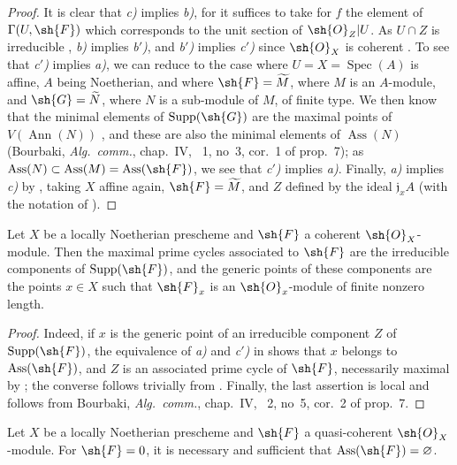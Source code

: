 \begin{proof}
It is clear that \emph{c)} implies \emph{b)}, for it suffices to take for $f$ the element of $\Gamma(U,\sh{F})$ which corresponds to the unit section of $\sh{O}_Z|U$.
As $U\cap Z$ is irreducible , \emph{b)} implies \emph{b$'$)}, and \emph{b$'$)} implies \emph{c$'$)} since $\sh{O}_X$ is coherent .
To see that \emph{c$'$)} implies \emph{a)}, we can reduce to the case where $U=X=\operatorname{Spec}(A)$ is affine, $A$ being Noetherian, and where $\sh{F}=\widetilde{M}$, where $M$ is an $A$-module, and $\sh{G}=\widetilde{N}$, where $N$ is a sub-module of $M$, of finite type.
We then know that the minimal elements of $\operatorname{Supp}(\sh{G})$ are the maximal points of $V(\operatorname{Ann}(N))$ , and these are also the minimal elements of $\operatorname{Ass}(N)$ (Bourbaki, \emph{Alg.\ comm.}, chap.~IV, \textsection~1, no~3, cor.~1 of prop.~7);
as $\operatorname{Ass}(N)\subset\operatorname{Ass}(M)=\operatorname{Ass}(\sh{F})$, we see that \emph{c$'$)} implies \emph{a)}.
Finally, \emph{a)} implies \emph{c)} by , taking $X$ affine again, $\sh{F}=\widetilde{M}$, and $Z$ defined by the ideal $\mathfrak{j}_xA$ (with the notation of ).
\end{proof}

\begin{corollary}[3.1.4]
\label{IV.3.1.4}
Let $X$ be a locally Noetherian prescheme and $\sh{F}$ a coherent $\sh{O}_X$-module.
Then the maximal prime cycles associated to $\sh{F}$ are the irreducible components of $\operatorname{Supp}(\sh{F})$, and the generic points of these components are the points $x\in X$ such that $\sh{F}_x$ is an $\sh{O}_x$-module of finite nonzero length.
\end{corollary}

\begin{proof}
Indeed, if $x$ is the generic point of an irreducible component $Z$ of $\operatorname{Supp}(\sh{F})$, the equivalence of \emph{a)} and \emph{c$'$)} in  shows that $x$ belongs to $\operatorname{Ass}(\sh{F})$, and $Z$ is an associated prime cycle of $\sh{F}$, necessarily maximal by ; the converse follows trivially from . Finally, the last assertion is local and follows from Bourbaki, \emph{Alg.\ comm.}, chap.~IV, \textsection~2, no~5, cor.~2 of prop.~7.
\end{proof}

\begin{corollary}[3.1.5]
\label{IV.3.1.5}
Let $X$ be a locally Noetherian prescheme and $\sh{F}$ a quasi-coherent $\sh{O}_X$-module.
For $\sh{F}=0$, it is necessary and sufficient that $\operatorname{Ass}(\sh{F})=\varnothing$.
\end{corollary}

